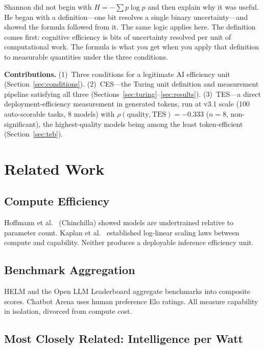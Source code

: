 \documentclass[12pt]{article}
\begin{document}
Shannon did not begin with $H = -\sum p \log p$ and then explain why it was useful. He
began with a definition---one bit resolves a single binary uncertainty---and showed the
formula followed from it. The same logic applies here. The definition comes first: cognitive
efficiency is bits of uncertainty resolved per unit of computational work. The formula is
what you get when you apply that definition to measurable quantities under the three
conditions.

\textbf{Contributions.} (1)~Three conditions for a legitimate AI efficiency unit
(Section~\ref{sec:conditions}). (2)~CES---the Turing unit definition and measurement
pipeline satisfying all three (Sections~\ref{sec:turing}--\ref{sec:results}). (3)~TES---a
direct deployment-efficiency measurement in generated tokens, run at v3.1 scale (100
auto-scorable tasks, 8 models) with $\rho(\mathrm{quality}, \mathrm{TES}) = -0.333$
($n = 8$, non-significant), the highest-quality models being among the least
token-efficient (Section~\ref{sec:teb}).

\section{Related Work}

\subsection{Compute Efficiency}

Hoffmann et al.\ \cite{hoffmann2022} (Chinchilla) showed models are undertrained relative to parameter count. Kaplan et al.\ \cite{kaplan2020} established log-linear scaling laws between compute and capability. Neither produces a deployable inference efficiency unit.

\subsection{Benchmark Aggregation}

HELM \cite{liang2022} and the Open LLM Leaderboard aggregate benchmarks into composite scores. Chatbot Arena \cite{chiang2024} uses human preference Elo ratings. All measure capability in isolation, divorced from compute cost.

\subsection{Most Closely Related: Intelligence per Watt}
\end{document}
